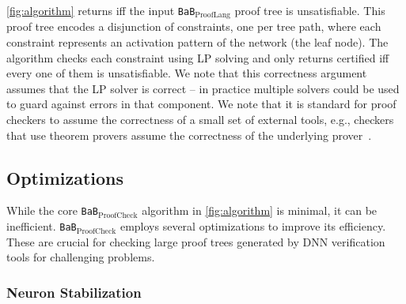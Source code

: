 \documentclass[oneside,11pt,dvipsnames]{book}
\newcommand{\prooflang}{\texttt{BaB$_{\text{ProofLang}}$}}
\newcommand{\proofcheck}{\texttt{BaB$_{\text{ProofCheck}}$}}
\begin{document}
 \autoref{fig:algorithm} returns \certified iff the input \prooflang{} proof tree is unsatisfiable. This proof tree encodes a disjunction of constraints, one per tree path, where each constraint represents an activation pattern of the network (the leaf node). The algorithm checks each constraint using LP solving and only returns certified iff every one of them is unsatisfiable.  
We note that this correctness argument assumes that the LP solver is correct -- in practice
multiple solvers could be used to guard against errors in that component.  We note that
it is standard for proof checkers to assume the correctness of a small set of external tools, e.g., checkers that use  theorem provers assume the correctness of the underlying prover~\cite{lammich2023grat}.

\subsection{Optimizations}
While the core \proofcheck{} algorithm in \autoref{fig:algorithm} is minimal, it can be inefficient. \proofcheck{} employs several optimizations to improve its efficiency. These are crucial for checking large proof trees generated by DNN verification tools for challenging problems.


\subsubsection{Neuron Stabilization}\label{sec:neuron-stabelization} 
\end{document}
